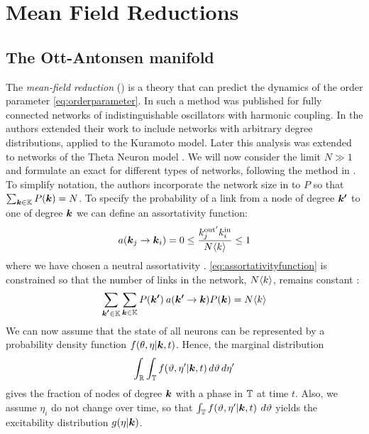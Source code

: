 \newpage
\section{Mean Field Reductions} \label{sec:MFRs}
\subsection{The Ott-Antonsen manifold}
The \textsl{mean-field reduction} (\MFR) is a theory that can predict the dynamics of the order parameter \eqref{eq:orderparameter}. In \cite{OttAntonsen2008, OttAntonsen2009, OttAntonsen2010} such a method was published for fully connected networks of indistinguishable oscillators with harmonic coupling. In \cite{Restrepo2014} the authors extended their work to include networks with arbitrary degree distributions, applied to the Kuramoto model. Later this analysis was extended to networks of the Theta Neuron model \cite{OttAntonsen2017}. We will now consider the limit $N \gg 1$ and formulate an exact \MFR for different types of networks, following the method in \cite{OttAntonsen2017}. \\

To simplify notation, the authors incorporate the network size in to $P$ so that $\sum_{{\boldsymbol{k}} \in {\mathbb{K}}} P({\boldsymbol{k}}) = N$. To specify the probability of a link from a node of degree ${\boldsymbol{k'}}$ to one of degree ${\boldsymbol{k}}$ we can define an assortativity function:
\begin{align}
a\left(\k_j \rightarrow \k_i \right) = 0 \leq \frac{k^{\rm{out}^{\prime}}_j k^{\rm{in}}_i}{N \kmean} \leq 1 \label{eq:assortativityfunction}
\end{align}
where we have chosen a neutral assortativity \cite{OttAntonsen2017}. \eqref{eq:assortativityfunction} is constrained so that the number of links in the network, $N {\langle k\rangle}$, remains constant \cite{Restrepo2014}:
\begin{align*}
\sum_{\kacc \in \K} \sum_{\k \in \K} P\left( \kacc \right) \: a\left(\kacc \rightarrow \k\right) P\left(\k\right) = N \kmean
\end{align*}
We can now assume that the state of all neurons can be represented by a probability density function $f(\theta, \eta | {\boldsymbol{k}}, t)$. Hence, the marginal distribution 
\begin{align*}
    \int_{{\mathbb{R}}} \int_{{\mathbb{T}}} f(\vartheta, \eta^{\prime} | {\boldsymbol{k}}, t) \mathop{d \vartheta} \mathop{d \eta^{\prime}} 
\end{align*}
gives the fraction of nodes of degree ${\boldsymbol{k}}$ with a phase in ${\mathbb{T}}$ at time $t$. Also, we assume $\eta_i$ do not change over time, so that $\int_{{\mathbb{T}}} f(\vartheta, \eta^{\prime} | {\boldsymbol{k}}, t) \: \mathop{d \vartheta}$ yields the excitability distribution $g(\eta | {\boldsymbol{k}})$. \\

